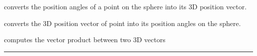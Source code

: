 \begin{related}
  \begin{sulist}{} %
  \item[\htmlref{ang2vec}{sub:ang2vec}] converts the position angles of a point on the sphere 
into its 3D position vector.
  \item[\htmlref{vec2ang}{sub:vec2ang}] converts the 3D position vector of point into its position
  angles on the sphere.
  \item[\htmlref{vect\_prod}{sub:vect_prod}] computes the vector product between two 3D vectors
  \end{sulist}
\end{related}

\rule{\hsize}{2mm}

\newpage
